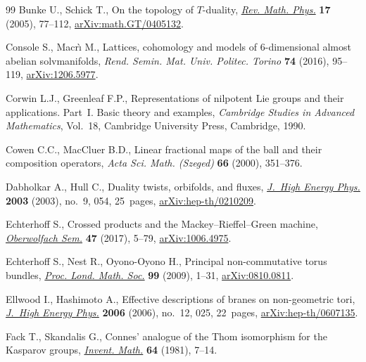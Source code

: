 \begin{thebibliography}{99}
Bunke U., Schick T., On the topology of {$T$}-duality, \href{https://doi.org/10.1142/S0129055X05002315}{\textit{Rev. Math.
 Phys.}} \textbf{17} (2005), 77--112, \href{https://arxiv.org/abs/math.GT/0405132}{arXiv:math.GT/0405132}.

Console S., Macr\`{\i} M., Lattices, cohomology and models of 6-dimensional
 almost abelian solvmanifolds, \textit{Rend. Semin. Mat. Univ. Politec.
 Torino} \textbf{74} (2016), 95--119, \href{https://arxiv.org/abs/1206.5977}{arXiv:1206.5977}.

Corwin L.J., Greenleaf F.P., Representations of nilpotent {L}ie groups and
 their applications. {P}art~{I}. Basic theory and examples, \textit{Cambridge
 Studies in Advanced Mathematics}, Vol.~18, Cambridge University Press,
 Cambridge, 1990.

Cowen C.C., MacCluer B.D., Linear fractional maps of the ball and their
 composition operators, \textit{Acta Sci. Math. (Szeged)} \textbf{66} (2000),
 351--376.

Dabholkar A., Hull C., Duality twists, orbifolds, and fluxes, \href{https://doi.org/10.1088/1126-6708/2003/09/054}{\textit{J.~High
 Energy Phys.}} \textbf{2003} (2003), no.~9, 054, 25~pages,
 \href{https://arxiv.org/abs/hep-th/0210209}{arXiv:hep-th/0210209}.

Echterhoff S., Crossed products and the Mackey--Rieffel--Green machine,
 \href{https://doi.org/10.1088/1126-6708/2003/09/054}{\textit{Oberwolfach Sem.}} \textbf{47} (2017), 5--79, \href{https://arxiv.org/abs/1006.4975}{arXiv:1006.4975}.

Echterhoff S., Nest R., Oyono-Oyono H., Principal non-commutative torus
 bundles, \href{https://doi.org/10.1112/plms/pdn050}{\textit{Proc. Lond. Math. Soc.}} \textbf{99} (2009), 1--31,
 \href{https://arxiv.org/abs/#2}{arXiv:0810.0811}.

Ellwood I., Hashimoto A., Effective descriptions of branes on non-geometric
 tori, \href{https://doi.org/10.1088/1126-6708/2006/12/025}{\textit{J.~High Energy Phys.}} \textbf{2006} (2006), no.~12, 025,
 22~pages, \href{https://arxiv.org/abs/hep-th/0607135}{arXiv:hep-th/0607135}.

Fack T., Skandalis G., Connes' analogue of the {T}hom isomorphism for the
 {K}asparov groups, \href{https://doi.org/10.1007/BF01393931}{\textit{Invent. Math.}} \textbf{64} (1981), 7--14.


\end{thebibliography}
